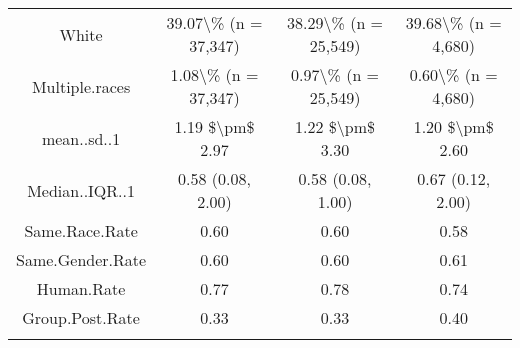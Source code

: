 \begin{table}[!htbp]
\begin{tabular}{@{\extracolsep{5pt}} cccc}
White & 39.07\textbackslash \% (n = 37,347) & 38.29\textbackslash \% (n = 25,549) & 39.68\textbackslash \% (n = 4,680) \\ 
Multiple.races & 1.08\textbackslash \% (n = 37,347) & 0.97\textbackslash \% (n = 25,549) & 0.60\textbackslash \% (n = 4,680) \\ 
mean..sd..1 & 1.19 \$\textbackslash pm\$ 2.97 & 1.22 \$\textbackslash pm\$ 3.30 & 1.20 \$\textbackslash pm\$ 2.60 \\ 
Median..IQR..1 & 0.58 (0.08, 2.00) & 0.58 (0.08, 1.00) & 0.67 (0.12, 2.00) \\ 
Same.Race.Rate & 0.60 & 0.60 & 0.58 \\ 
Same.Gender.Rate & 0.60 & 0.60 & 0.61 \\ 
Human.Rate & 0.77 & 0.78 & 0.74 \\ 
Group.Post.Rate & 0.33 & 0.33 & 0.40 \\ 
\hline \\[-1.8ex] 
\end{tabular} 
\end{table} 
